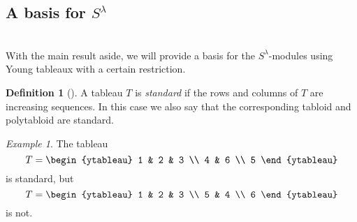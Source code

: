 \documentclass[12pt,twoside]{reedthesis}
\theoremstyle{plain}   %
\theoremstyle{definition}
\newtheorem{defn}{Definition}[section]
\theoremstyle{remark}
\newtheorem{ex}{Example}[section]
\numberwithin{equation}{section}
\begin{document}
  \subsection{A basis for $S^\lambda$} \hfill\\
  With the main result aside, we will provide a basis for the $S^\lambda$-modules using Young tableaux with a certain restriction.
  \begin{defn}[{\cite[Definition 2.5.1]{sagan}}]
    A tableau $T$ is \emph{standard} if the rows and columns of $T$ are increasing sequences. In this case we also say that the corresponding tabloid and polytabloid are standard.
  \end{defn}
  \begin{ex}
    The tableau
    \[
      T =
      \begin{ytableau}
        1 & 2 & 3 \\
        4 & 6 \\
        5
      \end{ytableau}
    \]
    is standard, but
    \[
      T =
      \begin{ytableau}
        1 & 2 & 3 \\
        5 & 4 \\
        6
      \end{ytableau}
    \]
    is not.
  \end{ex}
  
\end{document}
